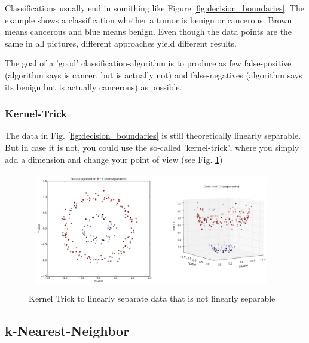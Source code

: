 \documentclass[a4paper, 11pt]{article}
\begin{document}
Classifications usually end in somithing like Figure \ref{fig:decision_boundaries}. The example shows a classification whether a tumor is benign or cancerous. Brown means cancerous and blue means benign. Even though the data points are the same in all pictures, different approaches yield different results.

The goal of a 'good' classification-algorithm is to produce as few false-positive (algorithm says is cancer, but is actually not) and false-negatives (algorithm says its benign but is actually cancerous) as possible. 

\subsubsection{Kernel-Trick}
The data in Fig. \ref{fig:decision_boundaries} is still theoretically linearly separable. But in case it is not, you could use the so-called 'kernel-trick', where you simply add a dimension and change your point of view (see Fig. \ref{fig:kernel_trick})

\begin{figure}[htb!]
    \centering
    \includegraphics[keepaspectratio=true,height=11\baselineskip]{kernel_trick.png}
    \caption{Kernel Trick to linearly separate data that is not linearly separable}
    \label{fig:kernel_trick}
\end{figure}

\subsection{k-Nearest-Neighbor}
\end{document}
